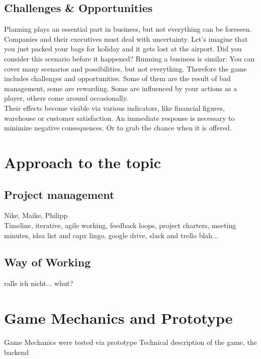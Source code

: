 \documentclass[11pt,titlepage,oneside,openany]{book}
\begin{document}
\section{Challenges \& Opportunities}
Planning plays an essential part in business, but not everything can be foreseen. Companies and their executives must deal with uncertainty. Let's imagine that you just packed your bags for holiday and it gets lost at the airport. Did you consider this scenario before it happened? Running a business is similar: You can cover many scenarios and possibilities, but not everything. Therefore the game includes challenges and opportunities. Some of them are the result of bad management, some are rewarding. Some are influenced by your actions as a player, others come around occasionally.\\
Their effects become visible via various indicators, like financial figures, warehouse or customer satisfaction. An immediate response is necessary to minimize negative consequences. Or to grab the chance when it is offered. 

\chapter{Approach to the topic}
\section{Project management}
Nike, Maike, Philipp \\
Timeline, iterative, agile working, feedback loops, project charters, meeting minutes, idea list and capx lingo, google drive, slack and trello blah... 
\section{Way of Working}
ralle ich nicht... whut?

\chapter{Game Mechanics and Prototype}
\label{cha:alg}
Game Mechanics were tested via prototype
Technical description of the game, the backend









\end{document}
